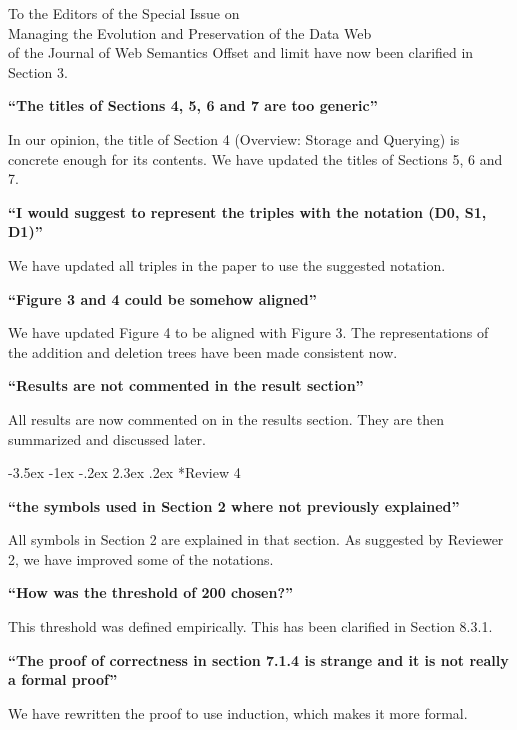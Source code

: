 \documentclass{letter}
\makeatletter
\newcounter{section}
\newcommand\section{\@startsection {section}{1}{\z@}%
                                   {-3.5ex \@plus -1ex \@minus -.2ex}%
                                   {2.3ex \@plus.2ex}%
                                   {\normalfont\Large\bfseries}}
\makeatother
\begin{document}
\begin{letter}{To the Editors of the Special Issue on\\Managing the Evolution and Preservation of the Data Web\\of the Journal of Web Semantics}
Offset and limit have now been clarified in Section 3.

\textbf{\enquote{The titles of Sections 4, 5, 6 and 7 are too generic}}

In our opinion, the title of Section 4 (Overview: Storage and Querying) is concrete enough for its contents.
We have updated the titles of Sections 5, 6 and 7.

\textbf{\enquote{I would suggest to represent the triples with the notation (D0, S1, D1)}}

We have updated all triples in the paper to use the suggested notation.

\textbf{\enquote{Figure 3 and 4 could be somehow aligned}}

We have updated Figure 4 to be aligned with Figure 3.
The representations of the addition and deletion trees have been made consistent now.

\textbf{\enquote{Results are not commented in the result section}}

All results are now commented on in the results section.
They are then summarized and discussed later.

\section*{Review 4}

\textbf{\enquote{the symbols used in Section 2 where not previously explained}}

All symbols in Section 2 are explained in that section.
As suggested by Reviewer 2, we have improved some of the notations.

\textbf{\enquote{How was the threshold of 200 chosen?}}

This threshold was defined empirically.
This has been clarified in Section 8.3.1.

\textbf{\enquote{The proof of correctness in section 7.1.4 is strange and it is not really a formal proof}}

We have rewritten the proof to use induction, which makes it more formal.

\end{letter}
\end{document}
